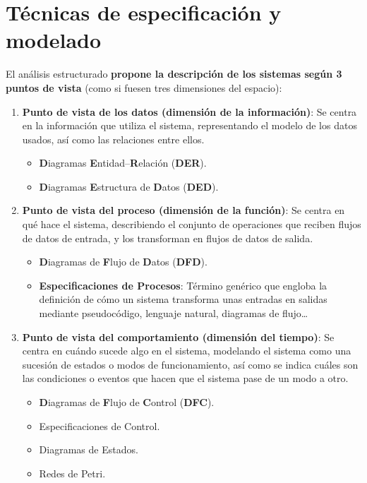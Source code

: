\section{Técnicas de especificación y modelado}

El análisis estructurado \textbf{propone la descripción de los sistemas según 3 puntos de vista} (como si fuesen tres dimensiones del espacio):

\begin{enumerate}
    \item \textbf{Punto de vista de los datos (dimensión de la información)}: Se centra en la información que utiliza el sistema, representando el modelo de los datos usados, así como las relaciones entre ellos.
          \begin{itemize}
              \item \textbf{D}iagramas \textbf{E}ntidad--\textbf{R}elación (\textbf{DER}).
              \item \textbf{D}iagramas \textbf{E}structura de \textbf{D}atos (\textbf{DED}).
          \end{itemize}
    \item \textbf{Punto de vista del proceso (dimensión de la función)}: Se centra en qué hace el sistema, describiendo el conjunto de operaciones que reciben flujos de datos de entrada, y los transforman en flujos de datos de salida.
          \begin{itemize}
              \item \textbf{D}iagramas de \textbf{F}lujo de \textbf{D}atos (\textbf{DFD}).
              \item \textbf{Especificaciones de Procesos}: Término genérico que engloba la definición de cómo un sistema transforma unas entradas en salidas mediante pseudocódigo, lenguaje natural, diagramas de flujo\ldots
          \end{itemize}
    \item \textbf{Punto de vista del comportamiento (dimensión del tiempo)}: Se centra en cuándo sucede algo en el sistema, modelando el sistema como una sucesión de estados o modos de funcionamiento, así como se indica cuáles son las condiciones o eventos que hacen que el sistema pase de un modo a otro.
          \begin{itemize}
              \item \textbf{D}iagramas de \textbf{F}lujo de \textbf{C}ontrol (\textbf{DFC}).
              \item Especificaciones de Control.
              \item Diagramas de Estados.
              \item Redes de Petri.
          \end{itemize}
\end{enumerate}

